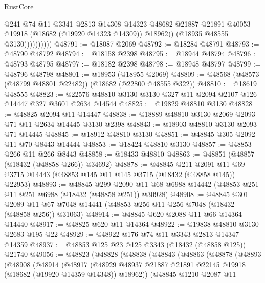 \begin{lexlean}{RustCore}
\begin{coremodule}
                          @241
                          @74
                          @11
                          @3341
                          @2813
                          @14308
                          @14323
                          @48682
                          @21887
                          @21891
                          @40053
                          @19918
                          (@18682 (@19920 @14323 @14309))
                          @18962))
                      (@18935 @48555 @3130))))))))))
@48791 := @18087 @2069
@48792 := @18284 @48791
@48793 := @48790 @48792
@48794 := @18158 @2398
@48795 := @18944 @48794
@48796 := @48793 @48795
@48797 := @18182 @2398
@48798 := @18948 @48797
@48799 := @48796 @48798
@48801 := @18953 (@18955 @2069)
@48809 := @48568 (@48573 (@48799 @48801 @22482)) (@18682 (@22800 @48555 @322))
@48810 := @18619 @48555
@48823 := @22576 @48810 @3130 @3130 @327 @11 @2094 @2107 @126 @14447 @327 @3601 @2634 @14544
@48825 := @19829 @48810 @3130
@48828 := @48825 @2094 @11 @14447
@48838 := @18889 @48810 @3130 @2069 @2093 @71 @11 @2634 @14445 @3130 @2398
@48843 := @18903 @48810 @3130 @2093 @71 @14445
@48845 := @18912 @48810 @3130
@48851 := @48845 @305 @2092 @11 @70 @8443 @14444
@48853 := @18424 @48810 @3130
@48857 := @48853 @266 @11 @266 @8443
@48858 := @18433 @48810
@48863 := @48851 (@48857 (@18432 (@48858 @266)) @34692)
@48878 := @48845
    @211
    @2091
    @11
    @69
    @3715
    @14443
    (@48853 @145 @11 @145 @3715 (@18432 (@48858 @145)) @22953)
@48893 := @48845
    @299
    @2090
    @11
    @68
    @6988
    @14442
    (@48853 @251 @11 @251 @6988 (@18432 (@48858 @251)) @30928)
@48908 := @48845
    @301
    @2089
    @11
    @67
    @7048
    @14441
    (@48853 @256 @11 @256 @7048 (@18432 (@48858 @256)) @31063)
@48914 := @48845 @620 @2088 @11 @66 @14364 @14440
@48917 := @48825 @620 @11 @14364
@48922 := @19838 @48810 @3130 @2683 @195 @22
@48929 := @48922 @176 @74 @11 @3343 @2813 @14347 @14359
@48937 := @48853 @125 @23 @125 @3343 (@18432 (@48858 @125)) @21740
@49056 := @48823
    (@48828
      (@48838
        (@48843
          (@48863
            (@48878
              (@48893
                (@48908
                  (@48914
                    (@48917
                      (@48929
                        @48937
                        @21887
                        @21891
                        @22145
                        @19918
                        (@18682 (@19920 @14359 @14348))
                        @18962))
                    (@48845
                      @1210
                      @2087
                      @11

\end{coremodule}
\end{lexlean}
